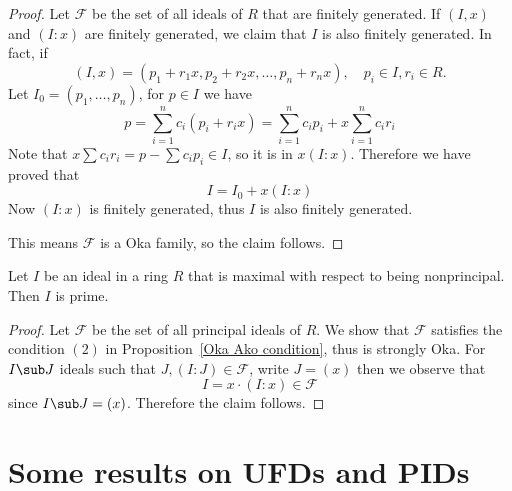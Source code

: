 \begin{proof}
Let $\mathcal{F}$ be the set of all ideals of $R$ that are finitely generated. If $(I,x)$ and $(I:x)$ are finitely generated, we claim that $I$ is also finitely generated. In fact, if 
\[(I,x)=(p_1+r_1x,p_2+r_2x,\dots,p_n+r_nx),\quad p_i\in I,r_i\in R.\]
Let $I_0=(p_1,\dots,p_n)$, for $p\in I$ we have
\[p=\sum_{i=1}^{n}c_i(p_i+r_ix)=\sum_{i=1}^{n}c_ip_i+x\sum_{i=1}^{n}c_ir_i\]
Note that $x\sum c_ir_i=p-\sum c_ip_i\in I$, so it is in $x(I:x)$. Therefore we have proved that
\[I=I_0+x(I:x)\]
Now $(I:x)$ is finitely generated, thus $I$ is also finitely generated.\par
This means $\mathcal{F}$ is a Oka family, so the claim follows.
\end{proof}
\begin{theorem}\label{prime nonprincipal}
Let $I$ be an ideal in a ring $R$ that is maximal with respect to being nonprincipal. Then $I$ is prime.
\end{theorem}
\begin{proof}
Let $\mathcal{F}$ be the set of all principal ideals of $R$. We show that $\mathcal{F}$ satisfies the condition $(2)$ in Proposition~\ref{Oka Ako condition}, thus is strongly Oka. For $I\sub J$ ideals such that $J,(I:J)\in\mathcal{F}$, write $J=(x)$ then we observe that
\[I=x\cdot(I:x)\in\mathcal{F}\]
since $I\sub J=(x)$. Therefore the claim follows.
\end{proof}
\section{Some results on UFDs and PIDs}
